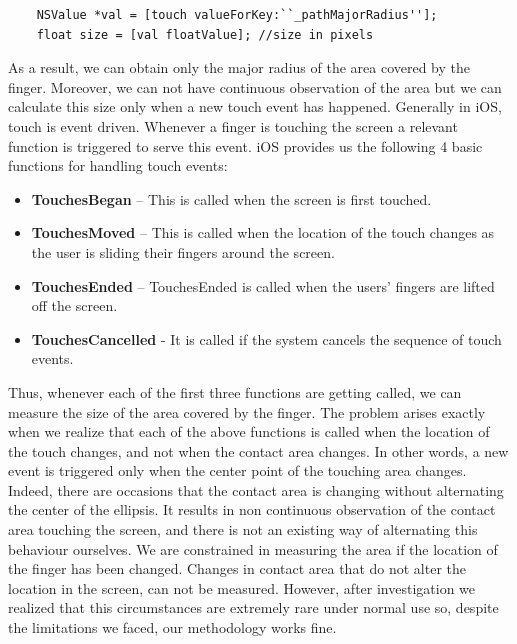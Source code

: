 \begin{lstlisting}
	NSValue *val = [touch valueForKey:``_pathMajorRadius''];
 	float size = [val floatValue]; //size in pixels
\end{lstlisting}


As a result, we can obtain only the major radius of the area covered by the finger. Moreover, we can not have continuous observation of the area but we can calculate this size only when a new touch event has happened. Generally in iOS, touch is event driven. Whenever a finger is touching the screen a relevant function is triggered to serve this event. iOS provides us the following 4 basic functions for handling touch events:

\begin{itemize}
	\item \textbf{TouchesBegan} – This is called when the screen is first touched.

	\item \textbf{TouchesMoved} – This is called when the location of the touch changes as the user is sliding their fingers around the screen.

	\item \textbf{TouchesEnded} – TouchesEnded is called when the users' fingers are lifted off the screen. 

	\item \textbf{TouchesCancelled} - It is called if the system cancels the sequence of touch events.
\end{itemize}	
	
Thus, whenever each of the first three functions are getting called, we can measure the size of the area covered by the finger. The problem arises exactly when we realize that each of the above functions is called when the location of the touch changes, and not when the contact area changes. In other words, a new event is triggered only when the center point of the touching area changes. Indeed, there are occasions that the contact area is changing without alternating the center of the ellipsis. 
 It results in non continuous observation of the contact area touching the screen, and there is not an existing way of alternating this behaviour ourselves. We are constrained in measuring the area if the location of the finger has been changed. Changes in contact area that do not alter the location in the screen, can not be measured. However, after investigation we realized that this circumstances are extremely rare under normal use so, despite the limitations we faced, our methodology works fine.


